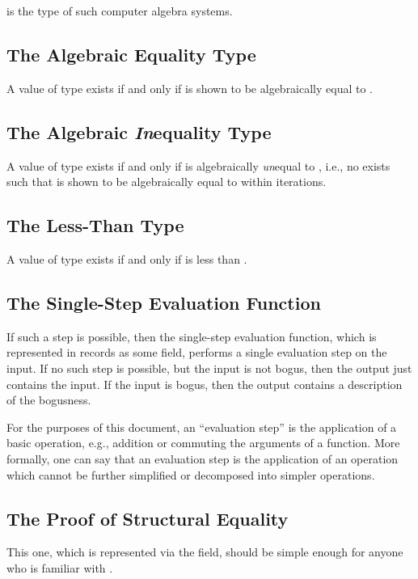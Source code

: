 \documentclass{report}
\begin{document}
 is the type of such computer algebra systems.

\subsection{The Algebraic Equality Type}
A value of type     exists if and only if  is shown to be algebraically equal to .

\subsection{The Algebraic \emph{In}equality Type}
A value of type     exists if and only if  is algebraically \emph{un}equal to , i.e., no  exists such that  is shown to be algebraically equal to  within  iterations.

\subsection{The Less-Than Type}
A value of type    exists if and only if  is less than .

\subsection{The Single-Step Evaluation Function}
If such a step is possible, then the single-step evaluation function, which is represented in  records as some  field, performs a single evaluation step on the input.  If no such step is possible, but the input is not bogus, then the output just contains the input.  If the input is bogus, then the output contains a description of the bogusness.

For the purposes of this document, an ``evaluation step'' is the application of a basic operation, e.g., addition or commuting the arguments of a function.  More formally, one can say that an evaluation step is the application of an operation which cannot be further simplified or decomposed into simpler operations.

\subsection{The Proof of Structural Equality}
This one, which is represented via the  field, should be simple enough for anyone who is familiar with .
\end{document}
